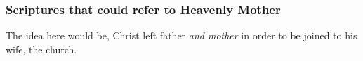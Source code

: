 		
	\subsubsection{Scriptures that could refer to Heavenly Mother}
		\label{HEAVENLYMOTHER-verses}
		
		\begin{compactitem}
			\item[{\hyperref[EPHESIANS-5-31]{Ephesians 5:31--32}}] \phantom{.}
				\begin{compactitem}
					\item The idea here would be, Christ left father \textit{and mother} in order to be joined to his wife, the church.
				\end{compactitem}
		\end{compactitem}